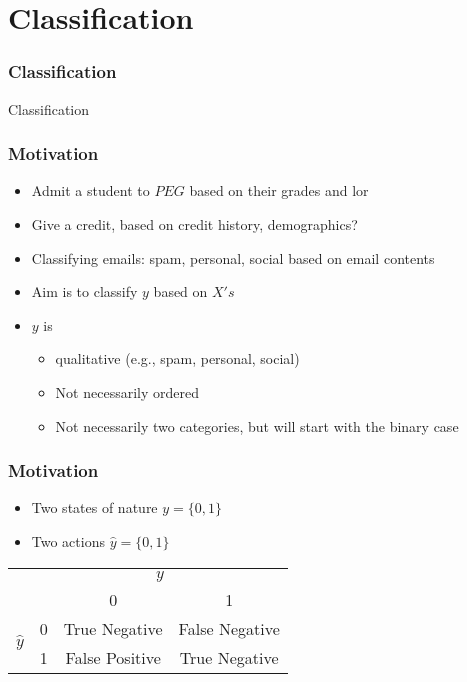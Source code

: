 \documentclass[
  shownotes,
  xcolor={svgnames},
  hyperref={colorlinks,citecolor=DarkBlue,linkcolor=DarkRed,urlcolor=DarkBlue}
  , aspectratio=169]{beamer}
\begin{document}
\section{Classification}
\begin{frame}[fragile]
\frametitle{Classification}


\centering
{\huge \textcolor{andesred}{Classification}}



\end{frame}
\begin{frame}[fragile]
\frametitle{Motivation}

\begin{itemize}
\item Admit a student to $PEG$ based on their grades and lor
\item Give a credit, based on credit history, demographics?
\item Classifying emails: spam, personal, social based on email contents
\bigskip
\item Aim is to classify $y$ based on $X's$
\item $y$ is
\begin{itemize}
  \item qualitative (e.g., spam, personal, social)
  \item Not necessarily ordered
  \item Not necessarily two categories, but will start with the binary case

\end{itemize}
\end{itemize}


\end{frame}
\begin{frame}[fragile]
\frametitle{Motivation}

\begin{itemize}
  \item Two states of nature $y=\{0,1\}$
  \item Two actions $\hat{y}=\{0,1\}$
\end{itemize}

\begin{table}[H]
\centering
\begin{tabular}{cccc}
 & \multicolumn{3}{c}{$y$}\tabularnewline
 &  & 0 & 1 \\
 \hline
\multirow{2}{*}{$\hat{y}$} & 0 & True Negative & False Negative \\
 & 1 & False Positive & True Negative \\
\end{tabular}
\end{table}






\end{frame}
\end{document}
